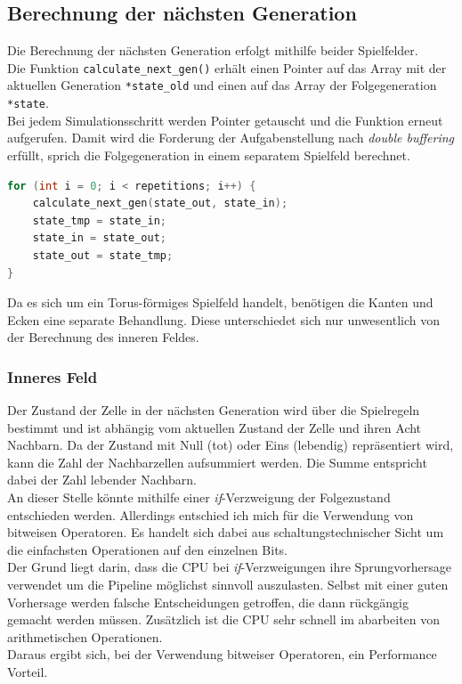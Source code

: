 \documentclass[german,plainarticle,hyperref,utf8]{zihpub}
\begin{document}
	\subsection{Berechnung der nächsten Generation}
	Die Berechnung der nächsten Generation erfolgt mithilfe beider Spielfelder.\\ Die Funktion \texttt{calculate\_next\_gen()} erhält einen Pointer auf das Array mit der aktuellen Generation \texttt{*state\_old} und einen auf das Array der Folgegeneration \texttt{*state}.\\
	Bei jedem Simulationsschritt werden Pointer getauscht und die Funktion erneut aufgerufen. Damit wird die Forderung der Aufgabenstellung nach \textit{double buffering} erfüllt, sprich die Folgegeneration in einem separatem Spielfeld berechnet.
	\begin{lstlisting}[language=C, caption=Vertauschen der Pointer for jedem Funktionsaufruf (vereinfacht)]
for (int i = 0; i < repetitions; i++) {
	calculate_next_gen(state_out, state_in);
	state_tmp = state_in;
	state_in = state_out;
	state_out = state_tmp;
}\end{lstlisting}
	Da es sich um ein Torus-förmiges Spielfeld handelt, benötigen die Kanten und Ecken eine separate Behandlung. Diese unterschiedet sich nur unwesentlich von der Berechnung des inneren Feldes.
	
	\subsubsection{Inneres Feld}
	Der Zustand der Zelle in der nächsten Generation wird über die Spielregeln bestimmt und ist abhängig vom aktuellen Zustand der Zelle und ihren Acht Nachbarn. Da der Zustand mit Null (tot) oder Eins (lebendig) repräsentiert wird, kann die Zahl der Nachbarzellen aufsummiert werden. Die Summe entspricht dabei der Zahl lebender Nachbarn.\\
	An dieser Stelle könnte mithilfe einer \textit{if}-Verzweigung der Folgezustand entschieden werden. Allerdings entschied ich mich für die Verwendung von bitweisen Operatoren. Es handelt sich dabei aus schaltungstechnischer Sicht um die einfachsten Operationen auf den einzelnen Bits.\\
	Der Grund liegt darin, dass die CPU bei \textit{if}-Verzweigungen ihre Sprungvorhersage verwendet um die Pipeline möglichst sinnvoll auszulasten. Selbst mit einer guten Vorhersage werden falsche Entscheidungen getroffen, die dann rückgängig gemacht werden müssen. Zusätzlich ist die CPU sehr schnell im abarbeiten von arithmetischen Operationen.\\
	Daraus ergibt sich, bei der Verwendung bitweiser Operatoren, ein Performance Vorteil.\\
	
\end{document}
